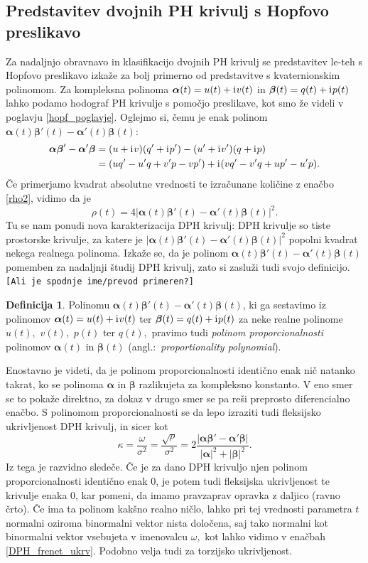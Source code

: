 \documentclass[12pt,a4paper,twoside]{article}
\newcommand{\iu}{\mathrm{i}\mkern1mu} %
\theoremstyle{definition} %
\newtheorem{definicija}{Definicija}[section]
\theoremstyle{plain} %
\theoremstyle{primerstyle}
\numberwithin{equation}{section}  %
\newcommand{\balpha}{\boldsymbol \alpha}
\newcommand{\bbeta}{\boldsymbol \beta}
\begin{document}
\subsection{Predstavitev dvojnih PH krivulj s Hopfovo preslikavo}

Za nadaljnjo obravnavo in klasifikacijo dvojnih PH krivulj se predstavitev le-teh s Hopfovo preslikavo izkaže za bolj primerno od predstavitve s kvaternionskim polinomom. Za kompleksna polinoma $\balpha(t)=u(t)+\iu v(t)$ in $\bbeta(t)=q(t)+\iu p(t)$ lahko podamo hodograf PH krivulje s pomočjo preslikave, kot smo že videli v poglavju \ref{hopf_poglavje}. Oglejmo si, čemu je enak polinom $\balpha(t)\bbeta'(t)-\balpha'(t)\bbeta(t):$
\begin{align}
	\balpha\bbeta'-\balpha'\bbeta&=(u+\iu v)(q'+\iu p')-(u'+\iu v')(q+\iu p) \nonumber \\
	&=(uq'-u'q+v'p-vp')+\iu(vq'-v'q+up'-u'p).
\end{align}
Če primerjamo kvadrat absolutne vrednosti te izračunane količine z enačbo \eqref{rho2}, vidimo da je
\begin{equation}
	\label{rho_propoly}
	\rho(t)=4|\balpha(t)\bbeta'(t)-\balpha'(t)\bbeta(t)|^2.
\end{equation}
Tu se nam ponudi nova karakterizacija DPH krivulj: DPH krivulje so tiste prostorske krivulje, za katere je $|\balpha(t)\bbeta'(t)-\balpha'(t)\bbeta(t)|^2$ popolni kvadrat nekega realnega polinoma. Izkaže se, da je polinom $\balpha(t)\bbeta'(t)-\balpha'(t)\bbeta(t)$ pomemben za nadaljnji študij DPH krivulj, zato si zasluži tudi svojo definicijo.\texttt{[Ali je spodnje ime/prevod primeren?]}
\begin{definicija}
	Polinomu $\balpha(t)\bbeta'(t)-\balpha'(t)\bbeta(t)$, ki ga sestavimo iz polinomov $\balpha(t)=u(t)+\iu v(t)$ ter $\bbeta(t)=q(t)+\iu p(t)$ za neke realne polinome $u(t),$ $v(t),$ $p(t)$ ter $q(t),$ pravimo tudi \emph{polinom proporcionalnosti} polinomov $\balpha(t)$ in $\bbeta(t)$ (angl.:\ \emph{proportionality polynomial}).
\end{definicija}
Enostavno je videti, da je polinom proporcionalnosti identično enak nič natanko takrat, ko se polinoma $\balpha$ in $\bbeta$ razlikujeta za kompleksno konstanto. V eno smer se to pokaže direktno, za dokaz v drugo smer se pa reši preprosto diferencialno enačbo.
S polinomom proporcionalnosti se da lepo izraziti tudi fleksijsko ukrivljenost DPH krivulj, in sicer kot
\begin{equation}
	\label{kappa_propoly}
	\kappa=\frac{\omega}{\sigma^2}=\frac{\sqrt{\rho}}{\sigma^2}=2\frac{|\balpha\bbeta'-\balpha'\bbeta|}{|\balpha|^2+|\bbeta|^2}.
\end{equation}
Iz tega je razvidno sledeče. Če je za dano DPH krivuljo njen polinom proporcionalnosti identično enak 0, je potem tudi fleksijska ukrivljenost te krivulje enaka 0, kar pomeni, da imamo pravzaprav opravka z daljico (ravno črto). Če ima ta polinom kakšno realno ničlo, lahko pri tej vrednosti parametra $t$ normalni oziroma binormalni vektor nista določena, saj tako normalni kot binormalni vektor vsebujeta v imenovalcu $\omega,$ kot lahko vidimo v enačbah \eqref{DPH_frenet_ukrv}. Podobno velja tudi za torzijsko ukrivljenost.
\end{document}
